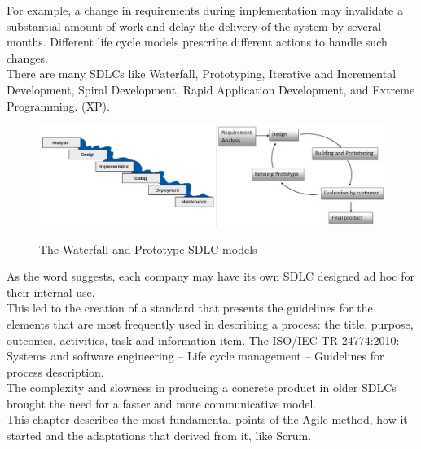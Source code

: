 For example, a change in requirements during implementation may invalidate a substantial amount of work and delay the delivery of the system by several months.
Different life cycle models prescribe different actions to handle such changes.\\
There are many SDLCs like Waterfall, Prototyping, Iterative and Incremental Development, Spiral Development, Rapid Application Development, and Extreme Programming. (XP). 
\begin{figure}[H]
	\centering
	\includegraphics[width=\textwidth]{resources/warterfall_prototype}\\
	\caption{The Waterfall and Prototype SDLC models}
\end{figure}
As the word  suggests, each company may have its own SDLC designed ad hoc for their internal use.\\
This led to the creation of a standard that presents the guidelines for the elements that are most frequently used in describing a process: the title, purpose, outcomes, activities, task and information item.
The ISO/IEC TR 24774:2010: Systems and software engineering -- Life cycle management -- Guidelines for process description.\\
The complexity and slowness in producing a concrete product in older SDLCs brought the need for a faster and more communicative model.\\
This chapter describes the most fundamental points of the Agile method, how it started and the adaptations that derived from it, like Scrum.
